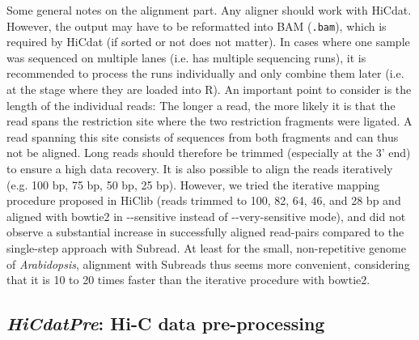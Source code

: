 \documentclass[a4paper,10pt]{article}
\begin{document}
Some general notes on the alignment part. Any aligner should work with HiCdat. However, the output may have to be reformatted into BAM (\texttt{.bam}), which is required by HiCdat (if sorted or not does not matter). In cases where one sample was sequenced on multiple lanes (i.e. has multiple sequencing runs), it is recommended to process the runs individually and only combine them later (i.e. at the stage where they are loaded into R). An important point to consider is the length of the individual reads: The longer a read, the more likely it is that the read spans the restriction site where the two restriction fragments were ligated. A read spanning this site consists of sequences from both fragments and can thus not be aligned. Long reads should therefore be trimmed (especially at the 3' end) to ensure a high data recovery. It is also possible to align the reads iteratively (e.g. 100 bp, 75 bp, 50 bp, 25 bp). However, we tried the iterative mapping procedure proposed in HiClib \cite{2012_Imakaev} (reads trimmed to 100, 82, 64, 46, and 28 bp and aligned with bowtie2 in {-}{-}sensitive instead of {-}{-}very-sensitive mode), and did not observe a substantial increase in successfully aligned read-pairs compared to the single-step approach with Subread. At least for the small, non-repetitive genome of \textit{Arabidopsis}, alignment with Subreads thus seems more convenient, considering that it is 10 to 20 times faster than the iterative procedure with bowtie2.
\subsection{\textit{HiCdatPre}: Hi-C data pre-processing}\label{usePrePro}
\end{document}
